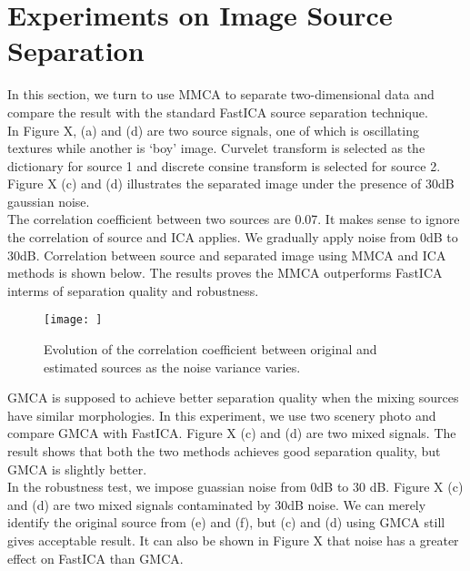 \section{Experiments on Image Source Separation}
In this section, we turn to use MMCA to separate two-dimensional data and compare the result with the standard FastICA source separation technique. \\

In Figure X, (a) and (d) are two source signals, one of which is oscillating textures while another is `boy' image. Curvelet transform is selected as the dictionary for source 1 and discrete consine transform is selected for source 2. Figure X (c) and (d) illustrates the separated image under the presence of 30dB gaussian noise.\\

The correlation coefficient between two sources are 0.07. It makes sense to ignore the correlation of source and ICA applies. We gradually apply noise from 0dB to 30dB. Correlation between source and separated image using MMCA and ICA methods is shown below.
The results proves the MMCA outperforms FastICA interms of separation quality and robustness.

\begin{figure}[H]
\centering
\texttt{[image: ]}
\caption{Evolution of the correlation coefficient between original and estimated sources as the noise variance varies.}
\label{imapint1}
\end{figure}

GMCA is supposed to achieve better separation quality when the mixing sources have similar morphologies. In this experiment, we use two scenery photo and compare GMCA with FastICA. Figure X (c) and (d) are two mixed signals. The result shows that both the two methods achieves good separation quality, but GMCA is slightly better. \\
In the robustness test, we impose guassian noise from 0dB to 30 dB. Figure X (c) and (d) are two mixed signals contaminated by 30dB noise. We can merely identify the original source from (e) and (f), but (c) and (d) using GMCA still gives acceptable result. It can also be shown in Figure X that noise has a greater effect on FastICA than GMCA. 
